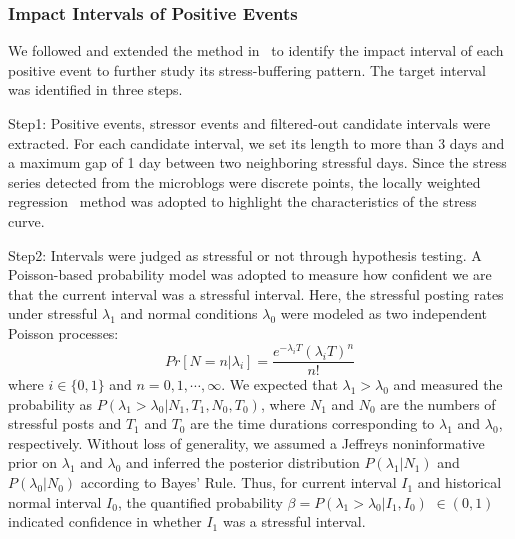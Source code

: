\subsubsection{Impact Intervals of Positive Events}
\label{subsec:interval}
We followed and extended the method in~\citep{Li2017Analyzing} to identify the impact interval of each positive event to further study its stress-buffering pattern. 
The target interval was identified in three steps.

Step1: Positive events, stressor events and filtered-out candidate intervals were extracted. 
For each candidate interval, 
we set its length to more than 3 days and a maximum gap of 1 day between two neighboring stressful days. 
Since the stress series detected from the microblogs were discrete points, 
the locally weighted regression~\citep{Cleveland1988Locally} method was adopted to highlight the characteristics of the stress curve.

Step2: Intervals were judged as stressful or not through hypothesis testing. 
A Poisson-based probability model was adopted to measure how confident we are that the current interval was a stressful interval. 
Here, 
the stressful posting rates under stressful $\lambda_1$ and normal conditions $\lambda_0$ were modeled 
as two independent Poisson processes: 
\begin{equation}
Pr[N=n|\lambda_i]=\frac{e^{-\lambda_i T}{(\lambda_i T)}^n}{n!}
\end{equation}
where $i\in\{0,1\}$ and $n=0,1,\cdots,\infty$.
We expected that $\lambda_1 > \lambda_0$ and measured the probability as $P(\lambda_1>\lambda_0|N_1, T_1, N_0, T_0)$,
where $N_1$ and $N_0$ are the numbers of stressful posts 
and $T_1$ and $T_0$ are the time durations corresponding to $\lambda_1$ and $\lambda_0$, respectively. 
Without loss of generality, we assumed a Jeffreys noninformative prior on $\lambda_1$ and $\lambda_0$ 
and inferred the posterior distribution $P(\lambda_1|N_1)$ and $P(\lambda_0|N_0)$ according to Bayes' Rule. 
Thus, for current interval $I_1$ and historical normal interval $I_0$,
the quantified probability $\beta = P(\lambda_1>\lambda_0|I_1,I_0)$ $\in (0,1)$ 
indicated confidence in whether $I_1$ was a stressful interval. 


